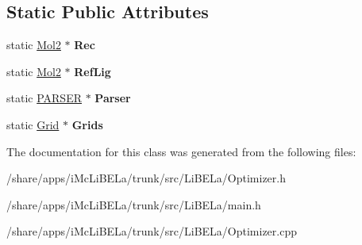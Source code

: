 \subsection*{Static Public Attributes}
\begin{DoxyCompactItemize}
\item 
\hypertarget{classOptimizer_a5c24b324ab19df11738bef91bc76bb53}{
static \hyperlink{classMol2}{Mol2} $\ast$ {\bfseries Rec}}
\label{classOptimizer_a5c24b324ab19df11738bef91bc76bb53}

\item 
\hypertarget{classOptimizer_a3a9f0461d3a2c5a80e74dc148a36f4aa}{
static \hyperlink{classMol2}{Mol2} $\ast$ {\bfseries RefLig}}
\label{classOptimizer_a3a9f0461d3a2c5a80e74dc148a36f4aa}

\item 
\hypertarget{classOptimizer_adb6ce5eb8dde2397acb547575ea92d27}{
static \hyperlink{classPARSER}{PARSER} $\ast$ {\bfseries Parser}}
\label{classOptimizer_adb6ce5eb8dde2397acb547575ea92d27}

\item 
\hypertarget{classOptimizer_a79bf9e282fc1fd7f87cf98362c546639}{
static \hyperlink{classGrid}{Grid} $\ast$ {\bfseries Grids}}
\label{classOptimizer_a79bf9e282fc1fd7f87cf98362c546639}

\end{DoxyCompactItemize}


The documentation for this class was generated from the following files:\begin{DoxyCompactItemize}
\item 
/share/apps/iMcLiBELa/trunk/src/LiBELa/Optimizer.h\item 
/share/apps/iMcLiBELa/trunk/src/LiBELa/main.h\item 
/share/apps/iMcLiBELa/trunk/src/LiBELa/Optimizer.cpp\end{DoxyCompactItemize}
